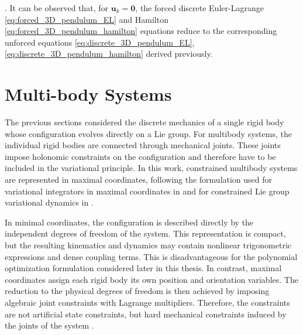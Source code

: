 \cite{Lee2008}.
It can be observed that, for $\bm{u}_k=\bm{0}$, the forced discrete Euler-Lagrange \eqref{eq:forced_3D_pendulum_EL} and Hamilton \eqref{eq:forced_3D_pendulum_hamilton} equations 
reduce to the corresponding unforced equations \eqref{eq:discrete_3D_pendulum_EL}, \eqref{eq:discrete_3D_pendulum_hamilton} derived previously.


\section{Multi-body Systems}
\label{sec:multi_body_systems}

The previous sections considered the discrete mechanics of a single rigid body whose
configuration evolves directly on a Lie group. For multibody systems, the individual
rigid bodies are connected through mechanical joints. These joints impose holonomic
constraints on the configuration and therefore have to be included in the variational
principle. In this work, constrained multibody systems are represented in maximal
coordinates, following the formulation used for variational integrators in
maximal coordinates in \cite{BrudigamManchester2021VariationalIntegrators} and for constrained
Lie group variational dynamics in \cite{Sangli2025}.

In minimal coordinates, the configuration is described directly by the independent
degrees of freedom of the system. This representation is compact, but the
resulting kinematics and dynamics may contain nonlinear trigonometric expressions
and dense coupling terms. This is disadvantageous for the polynomial optimization
formulation considered later in this thesis. In contrast, maximal coordinates assign
each rigid body its own position and orientation variables. The reduction to the
physical degrees of freedom is then achieved by imposing algebraic joint constraints
with Lagrange multipliers. Therefore, the constraints are not artificial state
constraints, but hard mechanical constraints induced by the joints of the system
\cite{BrudigamManchester2021VariationalIntegrators}.

